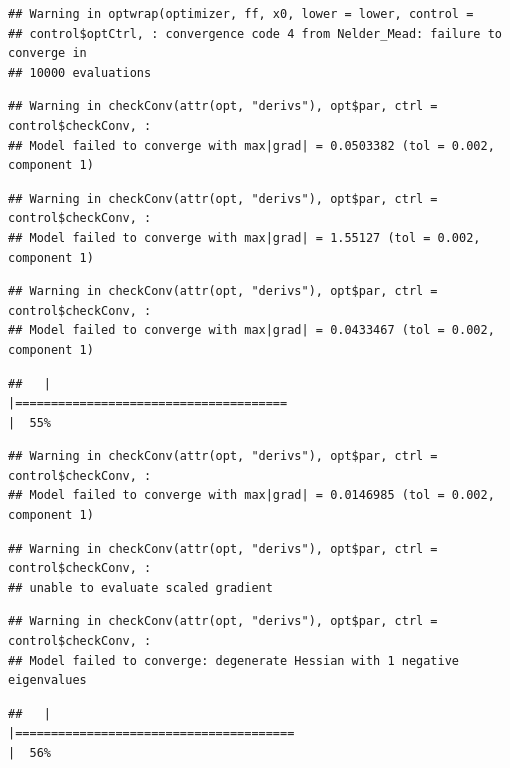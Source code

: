 \documentclass[
  12pt,
]{book}
\begin{document}
\begin{verbatim}
## Warning in optwrap(optimizer, ff, x0, lower = lower, control =
## control$optCtrl, : convergence code 4 from Nelder_Mead: failure to converge in
## 10000 evaluations
\end{verbatim}

\begin{verbatim}
## Warning in checkConv(attr(opt, "derivs"), opt$par, ctrl = control$checkConv, :
## Model failed to converge with max|grad| = 0.0503382 (tol = 0.002, component 1)
\end{verbatim}

\begin{verbatim}
## Warning in checkConv(attr(opt, "derivs"), opt$par, ctrl = control$checkConv, :
## Model failed to converge with max|grad| = 1.55127 (tol = 0.002, component 1)
\end{verbatim}

\begin{verbatim}
## Warning in checkConv(attr(opt, "derivs"), opt$par, ctrl = control$checkConv, :
## Model failed to converge with max|grad| = 0.0433467 (tol = 0.002, component 1)
\end{verbatim}

\begin{verbatim}
##   |                                                                              |======================================                                |  55%
\end{verbatim}

\begin{verbatim}
## Warning in checkConv(attr(opt, "derivs"), opt$par, ctrl = control$checkConv, :
## Model failed to converge with max|grad| = 0.0146985 (tol = 0.002, component 1)
\end{verbatim}

\begin{verbatim}
## Warning in checkConv(attr(opt, "derivs"), opt$par, ctrl = control$checkConv, :
## unable to evaluate scaled gradient
\end{verbatim}

\begin{verbatim}
## Warning in checkConv(attr(opt, "derivs"), opt$par, ctrl = control$checkConv, :
## Model failed to converge: degenerate Hessian with 1 negative eigenvalues
\end{verbatim}

\begin{verbatim}
##   |                                                                              |=======================================                               |  56%
\end{verbatim}
\end{document}
